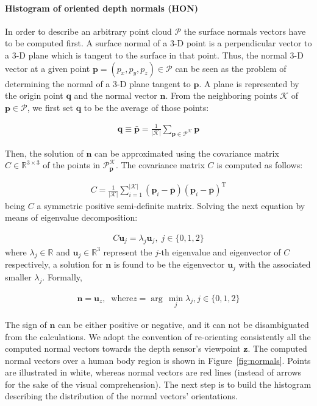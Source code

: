 \documentclass[10pt,twocolumn,letterpaper]{article}
\begin{document}
\paragraph{Histogram of oriented depth normals (HON)} 
In order to describe an arbitrary point cloud $\mathcal{P}$ the surface normals vectors have to be computed first. A surface normal of a 3-D point is a perpendicular vector to a 3-D plane which is tangent to the surface in that point. Thus, the normal 3-D vector at a given point $\mathbf{p} = (p_x, p_y, p_z) \in \mathcal{P}$ can be seen as the problem of determining the normal of a 3-D plane tangent to $\mathbf{p}$. A plane is represented by the origin point $\mathbf{q}$ and the normal vector $\mathbf{n}$. From the neighboring points $\mathcal{K}$ of $\mathbf{p} \in \mathcal{P}$, we first set $\mathbf{q}$ to be the average of those points:

\begin{gather}
	\mathbf{q} \equiv \bar{\mathbf{p}} = \frac{1}{|\mathcal{K}|} \sum_{\mathbf{p} \in \mathcal{P}^{\mathcal{K}}} \mathbf{p}
\end{gather}
 
Then, the solution of $\mathbf{n}$ can be approximated using the covariance matrix $C \in \mathbb{R}^{3 \times 3}$ of the points in $\mathcal{P}_\mathbf{p}^{\mathcal{K}}$. The covariance matrix $C$ is computed as follows: 

\begin{gather}
	C = \frac{1}{|\mathcal{K}|} \sum_{i=1}^{|\mathcal{K}|} (\mathbf{p}_i - \bar{\mathbf{p}}) (\mathbf{p}_i - \bar{\mathbf{p}})^{\mathrm{T}}
\end{gather}
being $C$ a symmetric positive semi-definite matrix. Solving the next equation by means of eigenvalue decomposition:

\begin{gather}
	C \mathbf{u}_j = \lambda_j \mathbf{u}_j, \; j \in \{0,1,2\}
\end{gather}
where $\lambda_j \in \mathbb{R}$ and $\mathbf{u}_j \in \mathbb{R}^3$ represent the $j$-th eigenvalue and eigenvector of $C$ respectively, a solution for $\mathbf{n}$ is found to be the eigenvector $\mathbf{u}_j$ with the associated smaller $\lambda_j$. Formally,

\begin{gather}
	\mathbf{n} = \mathbf{u}_z, \;\; \mathrm{where}  z = \arg\,\min_{j}{\lambda_j}, j \in \{0,1,2\}
\end{gather}

The sign of $\mathbf{n}$ can be either positive or negative, and it can not be disambiguated from the calculations. We adopt the convention of re-orienting consistently all the computed normal vectors towards the depth sensor's viewpoint $\mathbf{z}$. The computed normal vectors over a human body region is shown in Figure~\ref{fig:normals}. Points are illustrated in white, whereas normal vectors are red lines (instead of arrows for the sake of the visual comprehension). The next step is to build the histogram describing the distribution of the normal vectors' orientations.
\end{document}
